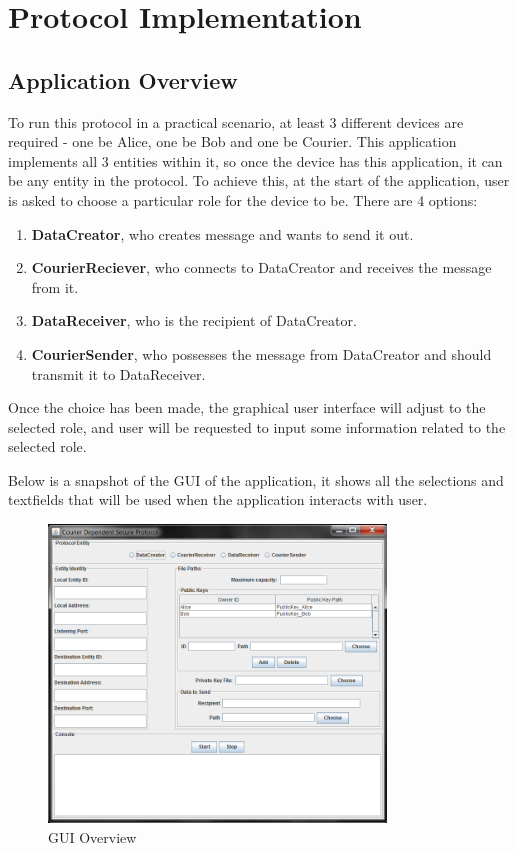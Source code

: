 \chapter{Protocol Implementation}
\section{Application Overview}
To run this protocol in a practical scenario, at least 3 different devices are required - one be Alice, one be Bob and one be Courier. This application implements all 3 entities within it, so once the device has this application, it can be any entity in the protocol. To achieve this, at the start of the application, user is asked to choose a particular role for the device to be. There are 4 options:
\begin{enumerate}
\item \textbf{DataCreator}, who creates message and wants to send it out.
\item \textbf{CourierReciever}, who connects to DataCreator and receives the message from it.
\item \textbf{DataReceiver}, who is the recipient of DataCreator.
\item \textbf{CourierSender}, who possesses the message from DataCreator and should transmit it to DataReceiver.
\end{enumerate}
Once the choice has been made, the graphical user interface will adjust to the selected role, and user will be requested to input some information related to the selected role. \par
Below is a snapshot of the GUI of the application, it shows all the selections and textfields that will be used when the application interacts with user.

\begin{figure}[h!]
\centering
\includegraphics[width=0.8\textwidth,natwidth=818,natheight=722]{figures/guiall.png}
\caption{GUI Overview}
\end{figure}

